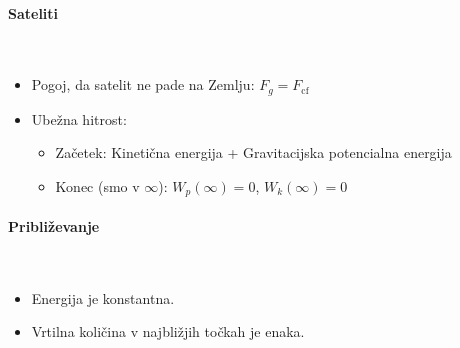 \paragraph{Sateliti} \ 
\begin{itemize}
    \item Pogoj, da satelit ne pade na Zemlju: \(F_g = F_\text{cf}\)
    \item Ubežna hitrost:
    \begin{itemize}
        \item Začetek: Kinetična energija + Gravitacijska potencialna energija
        \item Konec (smo v \(\infty\)): \(W_p(\infty) = 0\), \(W_k(\infty) = 0\)
    \end{itemize}
\end{itemize}

\paragraph{Približevanje} \ 
\begin{itemize}
    \item Energija je konstantna.
    \item Vrtilna količina v najbližjih točkah je enaka.
\end{itemize}
